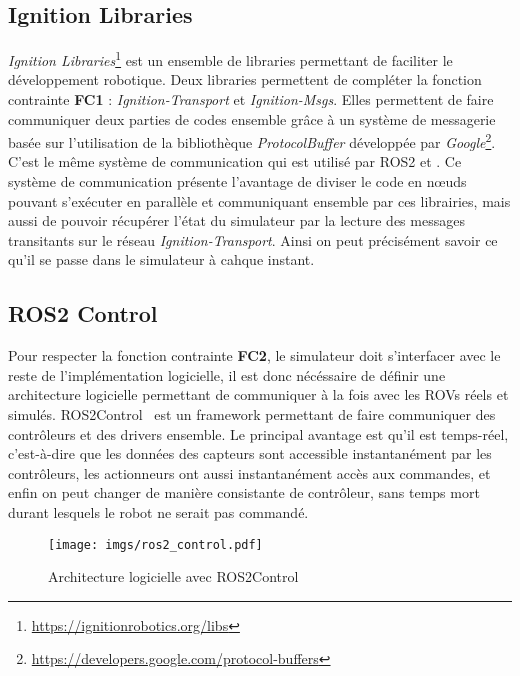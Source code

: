         \subsection{Ignition Libraries}

            \textit{Ignition Libraries}\footnote{\url{https://ignitionrobotics.org/libs}} est un ensemble de libraries permettant de faciliter le développement robotique. Deux libraries permettent de compléter la fonction contrainte \textbf{FC1} : \textit{Ignition-Transport} et \textit{Ignition-Msgs}. Elles permettent de faire communiquer deux parties de codes ensemble grâce à un système de messagerie basée sur l'utilisation de la bibliothèque \textit{ProtocolBuffer} développée par \textit{Google}\footnote{\url{https://developers.google.com/protocol-buffers}}. C'est le même système de communication qui est utilisé par \gls{ROS2} et \gazebo{}. Ce système de communication présente l'avantage de diviser le code en n\oe uds pouvant s'exécuter en parallèle et communiquant ensemble par ces librairies, mais aussi de pouvoir récupérer l'état du simulateur par la lecture des messages transitants sur le réseau \textit{Ignition-Transport}. Ainsi on peut précisément savoir ce qu'il se passe dans le simulateur à cahque instant.

        \subsection{ROS2 Control}

            Pour respecter la fonction contrainte \textbf{FC2}, le simulateur doit s'interfacer avec le reste de l'implémentation logicielle, il est donc nécéssaire de définir une architecture logicielle permettant de communiquer à la fois avec les \gls{ROV}s réels et simulés. \gls{ROS2Control}~\cite{ros_control} est un framework permettant de faire communiquer des contrôleurs et des drivers ensemble. Le principal avantage est qu'il est temps-réel, c'est-à-dire que les données des capteurs sont accessible instantanément par les contrôleurs, les actionneurs ont aussi instantanément accès aux commandes, et enfin on peut changer de manière consistante de contrôleur, sans temps mort durant lesquels le robot ne serait pas commandé.

            \begin{figure}[!htb]
                \centering
                \texttt{[image: imgs/ros2\_control.pdf]}
                \caption{Architecture logicielle avec \gls{ROS2Control}}
                \label{fig:ros2_control}
            \end{figure}

